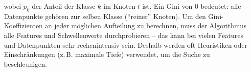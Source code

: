 wobei $p_k$ der Anteil der Klasse $k$ im Knoten $t$ ist.
Ein Gini von 0 bedeutet: alle Datenpunkte gehören zur selben Klasse (\enquote{reiner} Knoten). Um den Gini-Koeffizienten an jeder möglichen Aufteilung zu berechnen, muss der Algorithmus alle Features und Schwellenwerte durchprobieren -- das kann bei vielen Features und Datenpunkten sehr rechenintensiv sein. Deshalb werden oft Heuristiken oder Einschränkungen (z.\,B. maximale Tiefe) verwendet, um die Suche zu beschleunigen.


\newcommand{\namealine}{\textcolor{red}{Aline}}
\newcommand{\namebruno}{\textcolor{ForestGreen}{Bruno}}
\newcommand{\namecem}{\textcolor{blue}{Cem}}
\newcommand{\namedina}{\textcolor{orange}{Dina}}

